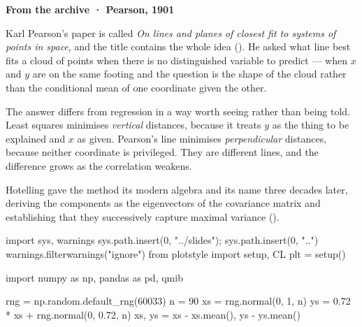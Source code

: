 \documentclass[
  letterpaper,
  10pt,
  twoside,
  openright,
  numbers=noenddot,
  chapterprefix=true]{scrbook}
\newenvironment{Shaded}{}{}
\newcommand{\DecValTok}[1]{\textcolor[rgb]{0.00,0.36,0.77}{#1}}
\newcommand{\FloatTok}[1]{\textcolor[rgb]{0.00,0.36,0.77}{#1}}
\newcommand{\ImportTok}[1]{\textcolor[rgb]{0.01,0.18,0.38}{#1}}
\newcommand{\NormalTok}[1]{\textcolor[rgb]{0.14,0.16,0.18}{#1}}
\newcommand{\OperatorTok}[1]{\textcolor[rgb]{0.14,0.16,0.18}{#1}}
\newcommand{\StringTok}[1]{\textcolor[rgb]{0.01,0.18,0.38}{#1}}
\newenvironment{qmibarchive}
  {\par\medskip\noindent{\color{econgold}\rule{\linewidth}{1.4pt}}%
   \par\nobreak\vspace{4pt}\noindent\ignorespaces}
  {\par\vspace{2pt}\noindent{\color{econrule}\rule{\linewidth}{0.4pt}}\par\medskip}
\begin{document}
\begin{qmibarchive}

\textbf{From the archive · Pearson, 1901}

Karl Pearson's paper is called \emph{On lines and planes of closest fit
to systems of points in space}, and the title contains the whole idea
(). He asked what line best fits
a cloud of points when there is no distinguished variable to predict ---
when \(x\) and \(y\) are on the same footing and the question is the
shape of the cloud rather than the conditional mean of one coordinate
given the other.

The answer differs from regression in a way worth seeing rather than
being told. Least squares minimises \emph{vertical} distances, because
it treats \(y\) as the thing to be explained and \(x\) as given.
Pearson's line minimises \emph{perpendicular} distances, because neither
coordinate is privileged. They are different lines, and the difference
grows as the correlation weakens.

Hotelling gave the method its modern algebra and its name three decades
later, deriving the components as the eigenvectors of the covariance
matrix and establishing that they successively capture maximal variance
().

\begin{Shaded}
\begin{Highlighting}[]
\ImportTok{import}\NormalTok{ sys, warnings}
\NormalTok{sys.path.insert(}\DecValTok{0}\NormalTok{, }\StringTok{"../slides"}\NormalTok{)}\OperatorTok{;}\NormalTok{ sys.path.insert(}\DecValTok{0}\NormalTok{, }\StringTok{".."}\NormalTok{)}
\NormalTok{warnings.filterwarnings(}\StringTok{"ignore"}\NormalTok{)}
\ImportTok{from}\NormalTok{ plotstyle }\ImportTok{import}\NormalTok{ setup, CL}
\NormalTok{plt }\OperatorTok{=}\NormalTok{ setup()}

\ImportTok{import}\NormalTok{ numpy }\ImportTok{as}\NormalTok{ np, pandas }\ImportTok{as}\NormalTok{ pd, qmib}

\NormalTok{rng }\OperatorTok{=}\NormalTok{ np.random.default\_rng(}\DecValTok{60033}\NormalTok{)}
\NormalTok{n }\OperatorTok{=} \DecValTok{90}
\NormalTok{xs }\OperatorTok{=}\NormalTok{ rng.normal(}\DecValTok{0}\NormalTok{, }\DecValTok{1}\NormalTok{, n)}
\NormalTok{ys }\OperatorTok{=} \FloatTok{0.72} \OperatorTok{*}\NormalTok{ xs }\OperatorTok{+}\NormalTok{ rng.normal(}\DecValTok{0}\NormalTok{, }\FloatTok{0.72}\NormalTok{, n)}
\NormalTok{xs, ys }\OperatorTok{=}\NormalTok{ xs }\OperatorTok{{-}}\NormalTok{ xs.mean(), ys }\OperatorTok{{-}}\NormalTok{ ys.mean()}


\end{Highlighting}
\end{Shaded}
\end{qmibarchive}
\end{document}
